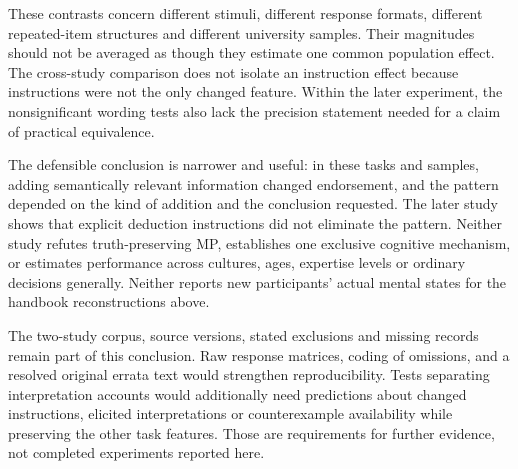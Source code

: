 These contrasts concern different stimuli, different response formats,
different repeated-item structures and different university samples. Their
magnitudes should not be averaged as though they estimate one common
population effect. The cross-study comparison does not isolate an
instruction effect because instructions were not the only changed feature.
Within the later experiment, the nonsignificant wording tests also lack
the precision statement needed for a claim of practical equivalence.

The defensible conclusion is narrower and useful: in these tasks and
samples, adding semantically relevant information changed endorsement,
and the pattern depended on the kind of addition and the conclusion
requested. The later study shows that explicit deduction instructions did
not eliminate the pattern. Neither study refutes truth-preserving MP,
establishes one exclusive cognitive mechanism, or estimates performance
across cultures, ages, expertise levels or ordinary decisions generally.
Neither reports new participants' actual mental states for the handbook
reconstructions above.

The two-study corpus, source versions, stated exclusions and missing records
remain part of this conclusion. Raw response matrices, coding of omissions,
and a resolved original errata text would strengthen reproducibility.
Tests separating interpretation accounts would additionally need predictions
about changed instructions, elicited interpretations or counterexample
availability while preserving the other task features. Those are requirements
for further evidence, not completed experiments reported here.
